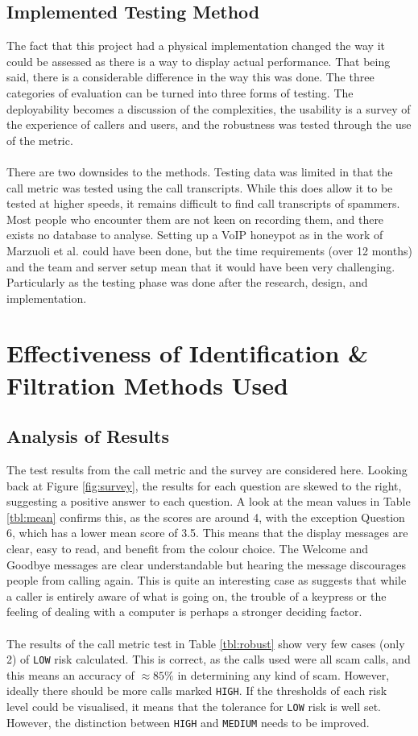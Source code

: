\documentclass[main.tex]{subfiles}
\begin{document}
\subsection{Implemented Testing Method}
The fact that this project had a physical implementation changed the way it could be assessed as there is a way to display actual performance. That being said, there is a considerable difference in the way this was done. The three categories of evaluation can be turned into three forms of testing. The deployability becomes a discussion of the complexities, the usability is a survey of the experience of callers and users, and the robustness was tested through the use of the metric.
\\\\
There are two downsides to the methods. Testing data was limited in that the call metric was tested using the call transcripts. While this does allow it to be tested at higher speeds, it remains difficult to find call transcripts of spammers. Most people who encounter them are not keen on recording them, and there exists no database to analyse. Setting up a VoIP honeypot as in the work of Marzuoli et al. \cite{marzuoli} could have been done, but the time requirements (over 12 months) and the team and server setup mean that it would have been very challenging. Particularly as the testing phase was done after the research, design, and implementation.

\section{Effectiveness of Identification \& Filtration Methods Used}
\subsection{Analysis of Results}
The test results from the call metric and the survey are considered here. Looking back at Figure \ref{fig:survey}, the results for each question are skewed to the right, suggesting a positive answer to each question. A look at the mean values in Table \ref{tbl:mean} confirms this, as the scores are around 4, with the exception Question 6, which has a lower mean score of 3.5. This means that the display messages are clear, easy to read, and benefit from the colour choice. The Welcome and Goodbye messages are clear understandable but hearing the message discourages people from calling again. This is quite an interesting case as suggests that while a caller is entirely aware of what is going on, the trouble of a keypress or the feeling of dealing with a computer is perhaps a stronger deciding factor.
\\\\
The results of the call metric test in Table \ref{tbl:robust} show very few cases (only 2) of \texttt{LOW} risk calculated. This is correct, as the calls used were all scam calls, and this means an accuracy of $\approx 85\%$ in determining any kind of scam. However, ideally there should be more calls marked \texttt{HIGH}. If the thresholds of each risk level could be visualised, it means that the tolerance for \texttt{LOW} risk is well set. However, the distinction between \texttt{HIGH} and \texttt{MEDIUM} needs to be improved.
\end{document}
